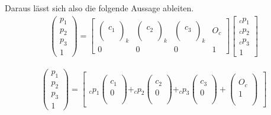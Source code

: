 Daraus lässt sich also die folgende Aussage ableiten. 
\begin{gather}
\begin{pmatrix}
p_1\\
p_2\\
p_3\\
1
\end{pmatrix}
=
\begin{bmatrix}
\begin{pmatrix}\\c_1\\\\ \end{pmatrix}_k & \begin{pmatrix}\\c_2\\\\ \end{pmatrix}_k & \begin{pmatrix}\\c_3\\\\ \end{pmatrix}_k & O_c\\
0&0&0&1
\end{bmatrix}
\begin{bmatrix}
_cp_1\\
_cp_2\\
_cp_3\\
1
\end{bmatrix}
\end{gather}

\begin{gather}
\begin{pmatrix}
p_1\\
p_2\\
p_3\\
1
\end{pmatrix}
=
\begin{bmatrix}
_cp_1\begin{pmatrix}\\c_1\\0\\\\ \end{pmatrix} + _cp_2\begin{pmatrix}\\c_2\\0\\\\ \end{pmatrix} + _cp_3\begin{pmatrix}\\c_3\\0\\\\ \end{pmatrix} + \begin{pmatrix}\\O_c\\1\\\\ \end{pmatrix}
\end{bmatrix}
\end{gather}
	
